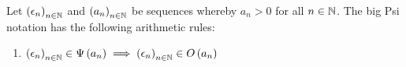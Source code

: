 \begin{theorem} \label{thm:bigpsi:rules}
  Let $\left({\epsilon_n}\right)_{{n}\in\mathbb N}$ and $\left({a_n}\right)_{{n}\in\mathbb N}$ be sequences whereby $a_n > 0$ for all $n\in\mathbb N$. The big Psi notation has the following arithmetic rules:

  \begin{enumerate}
    \item $\left({\epsilon_n}\right)_{{n}\in\mathbb N} \in \Psi\left( {a_n} \right) \implies \left({\epsilon_n}\right)_{{n}\in\mathbb N} \in O\left( {a_n} \right)$
  \end{enumerate}
\end{theorem}
